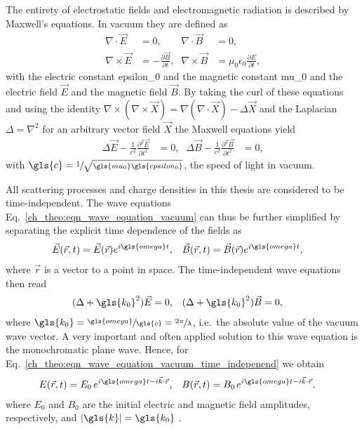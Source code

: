 The entirety of electrostatic fields and electromagnetic radiation is described by Maxwell's equations. In vacuum they are defined as
\begin{align*}
\nabla \cdotp \vec{E} &=0 \text{,} & \nabla \cdotp \vec{B} &=0 \text{,}\\
\nabla \times \vec{E} & = -\frac{\partial \vec{B}}{\partial t}\text{,} & \nabla \times \vec{B} &= \mu_0 \epsilon_0 \frac{\partial E}{\partial t} \text{,}
\end{align*}
with the electric constant \gls{epsilon_0} and the magnetic constant \gls{mu_0} and the electric field $\vec{E}$ and the magnetic field $\vec{B}$. By taking the curl of these equations and using the identity $\nabla \times (\nabla \times \vec{X}) = \nabla (\nabla \cdot \vec{X}) - \Delta \vec{X}$ and the Laplacian $\Delta = \nabla^2$ for an arbitrary vector field $\vec{X}$ the Maxwell equations yield
\begin{align}
\Delta \vec{E} - \frac{1}{c^2} \frac{\partial^2 \vec{E}}{\partial t^2} &= 0\text{,}& \Delta \vec{B} - \frac{1}{c^2} \frac{\partial^2 \vec{B}}{\partial t^2} &= 0\text{,} \label{ch_theo:eqn_wave_equation_vacuum}
\end{align}
with $\gls{c} = \sfrac{1}{\sqrt{\gls{mu_0}\gls{epsilon_0}}}$, the speed of light in vacuum.

All scattering processes and charge densities in this thesis are considered to be time-independent. The wave equations Eq.~\eqref{ch_theo:eqn_wave_equation_vacuum} can thus be further simplified by separating the explicit time dependence of the fields as
\begin{align}
\vec{E}(\vec{r},t) &= \vec{E}(\vec{r}) e^{i \gls{omega} t}\text{,} & \vec{B}(\vec{r},t) &= \vec{B}(\vec{r}) e^{i \gls{omega} t}\text{,}
\end{align}
where $\vec{r}$ is a vector to a point in space. The time-independent wave equations then read
\begin{align}
(\Delta  + \gls{k_0}^2 ) \vec{E} &= 0\text{,}& (\Delta  + \gls{k_0}^2 ) \vec{B} &= 0\text{,} \label{ch_theo:eqn_wave_equation_vacuum_time_indepenend}
\end{align}
where $\gls{k_0}= \sfrac{\gls{omega}}{\gls{c}} = \sfrac{2 \pi}{\lambda}$, i.e.~the absolute value of the vacuum wave vector. A very important and often applied solution to this wave equation is the monochromatic plane wave. Hence, for Eq.~\eqref{ch_theo:eqn_wave_equation_vacuum_time_indepenend} we obtain
\begin{align}
E(\vec{r},t) &= E_0 \, e^{i \gls{omega} t - i \vec{k} \cdot \vec{r}}\text{,} & B(\vec{r},t) &= B_0 \, e^{i \gls{omega} t - i \vec{k} \cdot \vec{r}}\text{,} \label{ch_theo:eqn_plain_wave}
\end{align}
where $E_0$ and $B_0$ are the initial electric and magnetic field amplitudes, respectively, and $|\gls{k}| = \gls{k_0}$ \cite{born_principles_1965}.

